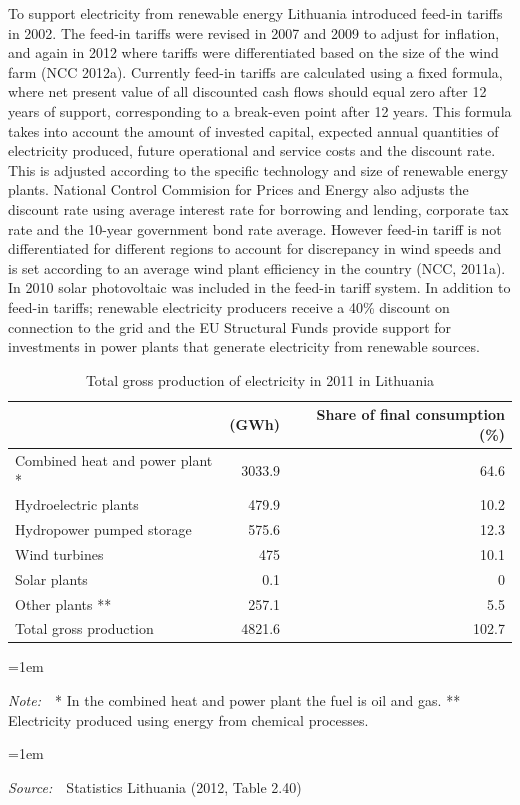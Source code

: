 \documentclass[a4paper, 12pt]{article}
\newcommand{\Figtext}[1]{%
	\begin{tablenotes}[para,flushleft]
		\hangindent=1em
		\footnotesize
		\raggedright
		#1
	\end{tablenotes}
}
\newcommand{\Fignote}[1]{\Figtext{\emph{Note:~}~#1}}
\newcommand{\Figsource}[1]{\Figtext{\emph{Source:~}~#1}}
\begin{document}
To support electricity from renewable energy Lithuania introduced feed-in tariffs in 2002. The feed-in tariffs were revised in 2007 and 2009 to adjust for inflation, and again in 2012 where tariffs were differentiated based on the size of the wind farm (NCC 2012a). Currently feed-in tariffs are calculated using a fixed formula, where net present value of all discounted cash flows should equal zero after 12 years of support, corresponding to a break-even point after 12 years. This formula takes into account the amount of invested capital, expected annual quantities of electricity produced, future operational and service costs and the discount rate. This is adjusted according to the specific technology and size of renewable energy plants. National Control Commision for Prices and Energy also adjusts the discount rate using average interest rate for borrowing and lending, corporate tax rate and the 10-year government bond rate average. However feed-in tariff is not differentiated for different regions to account for discrepancy in wind speeds and is set according to an average wind plant efficiency in the country (NCC, 2011a). In 2010 solar photovoltaic was included in the feed-in tariff system. In addition to feed-in tariffs; renewable electricity producers receive a 40\% discount on connection to the grid and the EU Structural Funds provide support for investments in power plants that generate electricity from renewable sources.

\begin{table}
	\caption{Total gross production of electricity in 2011 in Lithuania}
	\begin{tabular}{p{7.8cm} r r}  
		\hline  	
		 & (GWh) & Share of final consumption (\%) \\
		\hline   
		Combined heat and power plant * & 3033.9 & 64.6 \\
		Hydroelectric plants  & 479.9 & 10.2 \\
		Hydropower pumped storage  & 575.6 & 12.3 \\
		Wind turbines & 475 & 10.1 \\
		Solar plants & 0.1 & 0 \\
		Other plants ** & 257.1 & 5.5 \\
		Total gross production & 4821.6 & 102.7 \\
		\hline   
	\end{tabular}
	\Fignote{* In the combined heat and power plant the fuel is oil and gas. ** Electricity produced using energy from chemical processes.}
	\Figsource{Statistics Lithuania (2012, Table 2.40)}
	\label{tab:table_production-electricity-2011}
\end{table}
\end{document}
